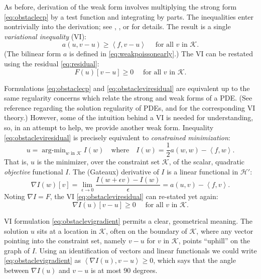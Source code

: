 \documentclass[letterpaper,final,12pt,reqno]{amsart}
\theoremstyle{claim}
\newcommand{\eps}{\epsilon}
\newcommand{\grad}{\nabla}
\newcommand{\ip}[2]{\left<#1,#2\right>}
\numberwithin{equation}{section}
\numberwithin{figure}{section}
\numberwithin{table}{section}
\numberwithin{theorem}{section}
\begin{document}
As before, derivation of the weak form involves multiplying the strong form \eqref{eq:obstaclecp} by a test function and integrating by parts.  The inequalities enter nontrivially into the derivation; see \cite[Chapter 12]{Bueler2021}, \cite{JouvetBueler2012}, or \cite{KinderlehrerStampacchia1980} for details.  The result is a single \emph{variational inequality} (VI):
\begin{equation}
  a(u,v-u) \ge \ip{f}{v-u} \quad \text{ for all } v \text{ in } \mathcal{K}. \label{eq:obstaclevi}
\end{equation}
(The bilinear form $a$ is defined in \eqref{eq:weakpoissonearly}.)  The VI can be restated using the residual \eqref{eq:residual}:
\begin{equation}
  F(u)[v-u] \ge 0 \quad \text{ for all } v \text{ in } \mathcal{K}. \label{eq:obstacleviresidual}
\end{equation}

Formulations \eqref{eq:obstaclecp} and \eqref{eq:obstacleviresidual} are equivalent up to the same regularity concerns which relate the strong and weak forms of a PDE.  (See reference \cite{Evans2010} regarding the solution regularity of PDEs, and \cite{KinderlehrerStampacchia1980} for the corresponding VI theory.)  However, some of the intuition behind a VI is needed for understanding, so, in an attempt to help, we provide another weak form.  Inequality \eqref{eq:obstacleviresidual} is precisely equivalent to \emph{constrained minimization}:
\newcommand{\argmin}{\mathop{\mathrm{arg\text{-}min}}}
\begin{equation}
  u = \argmin_{w \text{ in } \mathcal{K}} I(w) \quad \text{where} \quad I(w) = \frac{1}{2} a(w,w) - \ip{f}{w}. \label{eq:obstaclemin}
\end{equation}
That is, $u$ is the minimizer, over the constraint set $\mathcal{K}$, of the scalar, quadratic \emph{objective} functional $I$.  The (Gateaux) derivative of $I$ is a linear functional in $\mathcal{H}'$:
\begin{equation}
  \grad I(w)[v] = \lim_{\eps\to 0} \frac{I(w+\eps v) - I(w)}{\eps} = a(u,v) - \ip{f}{v}.  \label{eq:gradobjective}
\end{equation}
Noting $\nabla I = F$, the VI \eqref{eq:obstacleviresidual} can re-stated yet again:
\begin{equation}
  \nabla I(u)[v-u] \ge 0 \quad \text{ for all } v \text{ in } \mathcal{K}. \label{eq:obstaclevigradient}
\end{equation}

VI formulation \eqref{eq:obstaclevigradient} permits a clear, geometrical meaning.  The solution $u$ sits at a location in $\mathcal{K}$, often on the boundary of $\mathcal{K}$, where any vector pointing into the constraint set, namely $v-u$ for $v$ in $\mathcal{K}$, points ``uphill'' on the graph of $I$.  Using an identification of vectors and linear functionals we could write \eqref{eq:obstaclevigradient} as $\ip{\nabla I(u)}{v-u} \ge 0$, which says that the angle between $\nabla I(u)$ and $v-u$ is at most 90 degrees.
\end{document}
